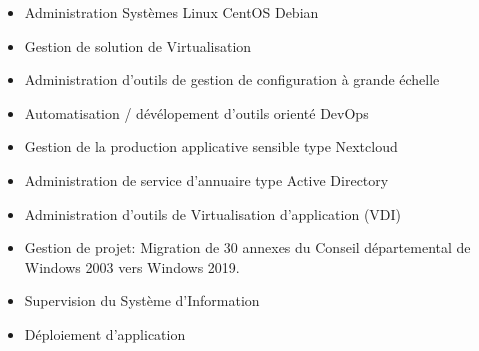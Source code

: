 \documentclass[10pt,a4paper,ragged2e]{altacv}
\begin{document}
 

\begin{fullwidth}
\makecvheader
\end{fullwidth}

\begin{itemize}
\item Administration Systèmes Linux CentOS Debian 
\item Gestion de solution de Virtualisation 
\item Administration d'outils de gestion de configuration à grande échelle
\item Automatisation / dévélopement d'outils orienté DevOps
\item Gestion de la production applicative sensible type Nextcloud
\item Administration de service d'annuaire type Active Directory
\item Administration d'outils de Virtualisation d'application (VDI) 
\item Gestion de projet: Migration de 30 annexes du Conseil départemental de Windows 2003 vers Windows 2019.
\item Supervision du Système d'Information
\item Déploiement d'application 
\end{itemize}

\divider

\end{document}
